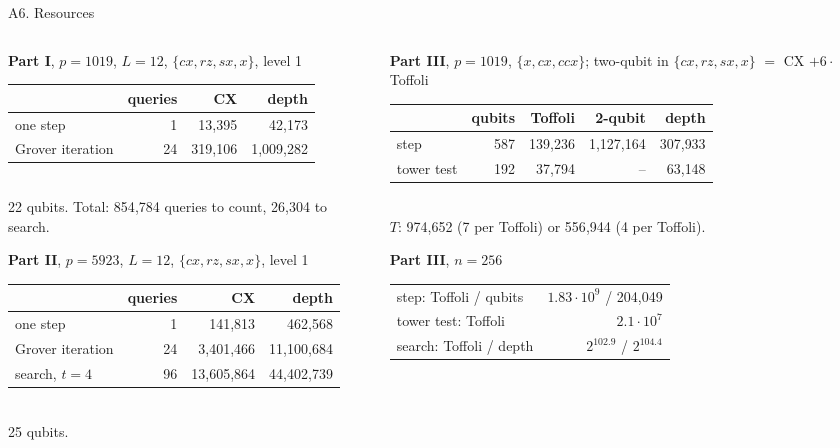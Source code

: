 \documentclass[aspectratio=169,10pt]{beamer}
\begin{document}
\begin{frame}{A6. Resources}
\scriptsize
\begin{columns}[T]
\begin{column}{0.48\textwidth}
\textbf{Part I}, $p=1019$, $L=12$, $\{cx,rz,sx,x\}$, level 1\\[2pt]
\begin{tabular}{lrrr}
\toprule
 & queries & CX & depth\\
\midrule
one step & 1 & 13{,}395 & 42{,}173\\
Grover iteration & 24 & 319{,}106 & 1{,}009{,}282\\
\bottomrule
\end{tabular}\\
22 qubits. Total: 854{,}784 queries to count, 26{,}304 to search.

\medskip
\textbf{Part II}, $p=5923$, $L=12$, $\{cx,rz,sx,x\}$, level 1\\[2pt]
\begin{tabular}{lrrr}
\toprule
 & queries & CX & depth\\
\midrule
one step & 1 & 141{,}813 & 462{,}568\\
Grover iteration & 24 & 3{,}401{,}466 & 11{,}100{,}684\\
search, $t=4$ & 96 & 13{,}605{,}864 & 44{,}402{,}739\\
\bottomrule
\end{tabular}\\
25 qubits.
\end{column}
\begin{column}{0.5\textwidth}
\textbf{Part III}, $p=1019$, $\{x,cx,ccx\}$; two-qubit in $\{cx,rz,sx,x\}$ $=$ CX $+6\cdot$Toffoli\\[2pt]
\begin{tabular}{lrrrr}
\toprule
 & qubits & Toffoli & 2-qubit & depth\\
\midrule
step & 587 & 139{,}236 & 1{,}127{,}164 & 307{,}933\\
tower test & 192 & 37{,}794 & -- & 63{,}148\\
\bottomrule
\end{tabular}\\
$T$: 974{,}652 (7 per Toffoli) or 556{,}944 (4 per Toffoli).

\medskip
\textbf{Part III}, $n=256$\\[2pt]
\begin{tabular}{lr}
\toprule
step: Toffoli / qubits & $1.83\cdot10^9$ / 204{,}049\\
tower test: Toffoli & $2.1\cdot10^7$\\
search: Toffoli / depth & $2^{102.9}$ / $2^{104.4}$\\
\bottomrule
\end{tabular}
\end{column}
\end{columns}
\end{frame}
\end{document}
